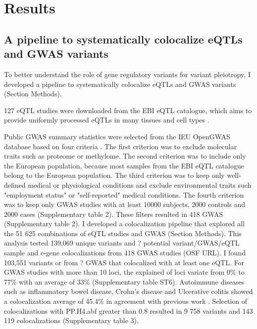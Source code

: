 \section*{Results}\label{s:results}

\subsection*{A pipeline to systematically colocalize eQTLs and GWAS variants}

To better understand the role of gene regulatory variants for variant pleiotropy, I developed a pipeline to systematically colocalize eQTLs and GWAS variants (Section Methods).

127 eQTL studies were downloaded from the EBI eQTL catalogue, which aims to provide uniformly processed eQTLs in many tissues and cell types \citep{2021.Alasoo.Kerimov}.

Public GWAS summary statistics were selected from the IEU OpenGWAS database based on four criteria \citep{2018.Parkinson.Buniello}.
%
The first criterion was to exclude molecular traits such as proteome or methylome.
%	
The second criterion was to include only the European population, because most samples from the EBI eQTL catalogue belong to the European population.
%
The third criterion was to keep only well-defined medical or physiological conditions and exclude environmental traits such "employment status" or "self-reported" medical conditions.
%
The fourth criterion was to keep only GWAS studies with at least 10000 subjects, 2000 controls and 2000 cases (Supplementary table 2).
%
These filters resulted in 418 GWAS (Supplementary table 2).
%
I developed a colocalization pipeline that explored all the 51 625 combinations of eQTL studies and GWAS (Section Methods).
%
This analysis tested 139,069 unique variants and ? potential variant/GWAS/eQTL sample and e-gene colocalizations from 418 GWAS studies (OSF URL).
%
I found 103,551 variants or from ? GWAS that colocalized with at least one eQTL.
%
For GWAS studies with more than 10 loci, the explained of loci variate from 0\% to 77\% with an average of 33\% (Supplementary table ST6).
%
Autoimmune diseases such as inflammatory bowel disease, Crohn's disease and Ulcerative colitis showed a colocalization average of 45.4\% in agreement with previous work \citep{2021.Li.Mu.GenomeBiology.impactcelltype}.
%
Selection of colocalizations with PP.H4.abf greater than 0.8 resulted in 9 758 variants and 143 119 colocalizations (Supplementary table 3).

